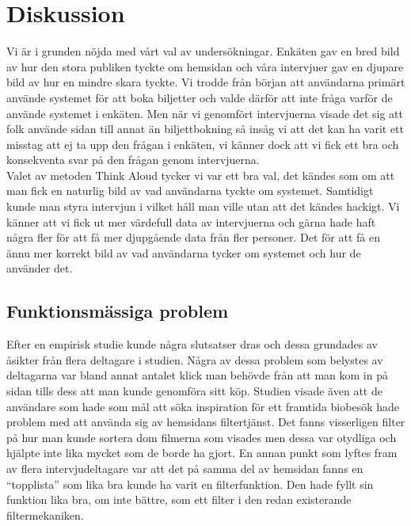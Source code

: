 \documentclass[swedish,a4paper,11pt]{article}
\begin{document}
\newpage
\section{Diskussion}
Vi är i grunden nöjda med vårt val av undersökningar. Enkäten gav en bred bild av hur den stora publiken tyckte om hemsidan och våra intervjuer gav en djupare bild av hur en mindre skara tyckte. Vi trodde från början att användarna primärt använde systemet för att boka biljetter och valde därför att inte fråga varför de använde systemet i enkäten. Men när vi genomfört intervjuerna visade det sig att folk använde sidan till annat än biljettbokning så insåg vi att det kan ha varit ett misstag att ej ta upp den frågan i enkäten, vi känner dock att vi fick ett bra och konsekventa svar på den frågan genom intervjuerna.\\ 
Valet av metoden Think Aloud tycker vi var ett bra val, det kändes som om att man fick en naturlig bild av vad användarna tyckte om systemet. Samtidigt kunde man styra intervjun i vilket håll man ville utan att det kändes hackigt. Vi känner att vi fick ut mer värdefull data av intervjuerna och gärna hade haft några fler för att få mer djupgående data från fler personer. Det för att få en ännu mer korrekt bild av vad användarna tycker om systemet och hur de använder det.

\subsection{Funktionsmässiga problem}
Efter en empirisk studie kunde några slutsatser dras och dessa grundades av åsikter från flera deltagare i studien. Några av dessa problem som belystes av deltagarna var bland annat antalet klick man behövde från att man kom in på sidan tills dess att man kunde genomföra sitt köp. 
Studien visade även att de användare som hade som mål att söka inspiration för ett framtida biobesök hade problem med att använda sig av hemsidans filtertjänst. Det fanns visserligen filter på hur man kunde sortera dom filmerna som visades men dessa var otydliga och hjälpte inte lika mycket som de borde ha gjort. 
En annan punkt som lyftes fram av flera intervjudeltagare var att det på samma del av hemsidan fanns en “topplista” som lika bra kunde ha varit en filterfunktion. Den hade fyllt sin funktion lika bra, om inte bättre, som ett filter i den redan existerande filtermekaniken. 
\end{document}
